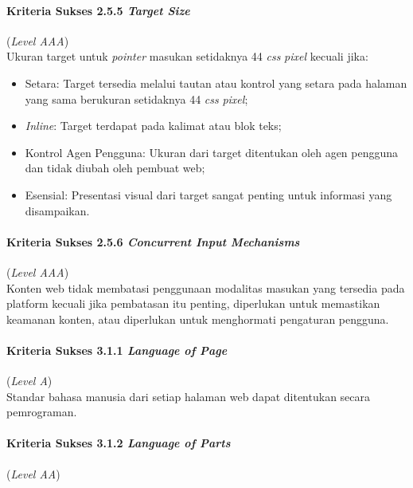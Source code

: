 \paragraph{Kriteria Sukses 2.5.5 \textit{Target Size}}
\label{subsec:kriteria_2.5.5}
(\textit{Level AAA}) \\

Ukuran target untuk \textit{pointer} masukan setidaknya 44 \textit{css} \textit{pixel} kecuali jika:

\begin{itemize}
	\item Setara: Target tersedia melalui tautan atau kontrol yang setara pada halaman yang sama berukuran setidaknya 44 \textit{css} \textit{pixel};
	\item \textit{Inline}: Target terdapat pada kalimat atau blok teks;
	\item Kontrol Agen Pengguna: Ukuran dari target ditentukan oleh agen pengguna dan tidak diubah oleh pembuat web;
	\item Esensial: Presentasi visual dari target sangat penting untuk informasi yang disampaikan.
\end{itemize}

\paragraph{Kriteria Sukses 2.5.6 \textit{Concurrent Input Mechanisms}}
\label{subsec:kriteria_2.5.6}
(\textit{Level AAA}) \\

Konten web tidak membatasi penggunaan modalitas masukan yang tersedia pada platform kecuali jika pembatasan itu penting, diperlukan untuk memastikan keamanan konten, atau diperlukan untuk menghormati pengaturan pengguna.

\paragraph{Kriteria Sukses 3.1.1 \textit{Language of Page}}
\label{subsec:kriteria_3.1.1}
(\textit{Level A}) \\

Standar bahasa manusia dari setiap halaman web dapat ditentukan secara pemrograman.

\paragraph{Kriteria Sukses 3.1.2 \textit{Language of Parts}}
\label{subsec:kriteria_3.1.2}
(\textit{Level AA}) \\

